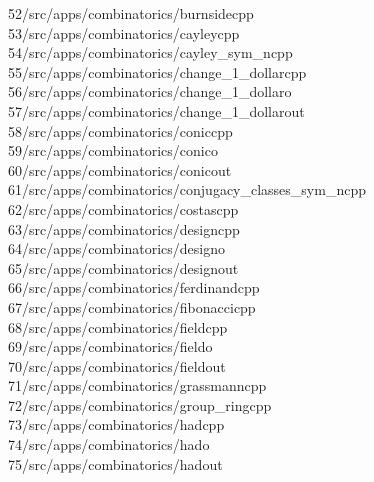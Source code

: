 \begin{tabbing}
52\>/src/apps/combinatorics/burnsidecpp\\[0pt]
53\>/src/apps/combinatorics/cayleycpp\\[0pt]
54\>/src/apps/combinatorics/cayley\_sym\_ncpp\\[0pt]
55\>/src/apps/combinatorics/change\_1\_dollarcpp\\[0pt]
56\>/src/apps/combinatorics/change\_1\_dollaro\\[0pt]
57\>/src/apps/combinatorics/change\_1\_dollarout\\[0pt]
58\>/src/apps/combinatorics/coniccpp\\[0pt]
59\>/src/apps/combinatorics/conico\\[0pt]
60\>/src/apps/combinatorics/conicout\\[0pt]
61\>/src/apps/combinatorics/conjugacy\_classes\_sym\_ncpp\\[0pt]
62\>/src/apps/combinatorics/costascpp\\[0pt]
63\>/src/apps/combinatorics/designcpp\\[0pt]
64\>/src/apps/combinatorics/designo\\[0pt]
65\>/src/apps/combinatorics/designout\\[0pt]
66\>/src/apps/combinatorics/ferdinandcpp\\[0pt]
67\>/src/apps/combinatorics/fibonaccicpp\\[0pt]
68\>/src/apps/combinatorics/fieldcpp\\[0pt]
69\>/src/apps/combinatorics/fieldo\\[0pt]
70\>/src/apps/combinatorics/fieldout\\[0pt]
71\>/src/apps/combinatorics/grassmanncpp\\[0pt]
72\>/src/apps/combinatorics/group\_ringcpp\\[0pt]
73\>/src/apps/combinatorics/hadcpp\\[0pt]
74\>/src/apps/combinatorics/hado\\[0pt]
75\>/src/apps/combinatorics/hadout\\[0pt]

\end{tabbing}
